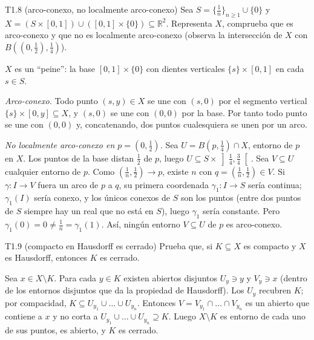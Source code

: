 \begin{ejercicio}{T1.8 (arco-conexo, no localmente arco-conexo)}
Sea $S = \{\frac1n\}_{n \geq 1} \cup \{0\}$ y $X = (S \times [0,1]) \cup ([0,1] \times \{0\}) \subseteq \mathbb{R}^2$. Representa $X$, comprueba que es arco-conexo y que no es localmente arco-conexo (observa la intersección de $X$ con $B((0,\frac12),\frac14)$).

\sol \fuentepropia

$X$ es un ``peine'': la base $[0,1] \times \{0\}$ con dientes verticales $\{s\} \times [0,1]$ en cada $s \in S$.

\emph{Arco-conexo.} Todo punto $(s,y) \in X$ se une con $(s,0)$ por el segmento vertical $\{s\} \times [0,y] \subseteq X$, y $(s,0)$ se une con $(0,0)$ por la base. Por tanto todo punto se une con $(0,0)$ y, concatenando, dos puntos cualesquiera se unen por un arco.

\emph{No localmente arco-conexo en $p = (0,\frac12)$.} Sea $U = B(p,\frac14) \cap X$, entorno de $p$ en $X$. Los puntos de la base distan $\frac12$ de $p$, luego $U \subseteq S \times \left]\frac14,\frac34\right[$. Sea $V \subseteq U$ cualquier entorno de $p$. Como $(\frac1n,\frac12) \to p$, existe $n$ con $q = (\frac1n,\frac12) \in V$. Si $\gamma \colon I \to V$ fuera un arco de $p$ a $q$, su primera coordenada $\gamma_1 \colon I \to S$ sería continua; $\gamma_1(I)$ sería conexo, y los únicos conexos de $S$ son los puntos (entre dos puntos de $S$ siempre hay un real que no está en $S$), luego $\gamma_1$ sería constante. Pero $\gamma_1(0) = 0 \neq \frac1n = \gamma_1(1)$. Así, ningún entorno $V \subseteq U$ de $p$ es arco-conexo.
\end{ejercicio}

\begin{ejercicio}{T1.9 (compacto en Hausdorff es cerrado)}
Prueba que, si $K \subseteq X$ es compacto y $X$ es Hausdorff, entonces $K$ es cerrado.

\sol \fuentepropia

Sea $x \in X \setminus K$. Para cada $y \in K$ existen abiertos disjuntos $U_y \ni y$ y $V_y \ni x$ (dentro de los entornos disjuntos que da la propiedad de Hausdorff). Los $U_y$ recubren $K$; por compacidad, $K \subseteq U_{y_1} \cup \dots \cup U_{y_n}$. Entonces $V = V_{y_1} \cap \dots \cap V_{y_n}$ es un abierto que contiene a $x$ y no corta a $U_{y_1} \cup \dots \cup U_{y_n} \supseteq K$. Luego $X \setminus K$ es entorno de cada uno de sus puntos, es abierto, y $K$ es cerrado.
\end{ejercicio}

